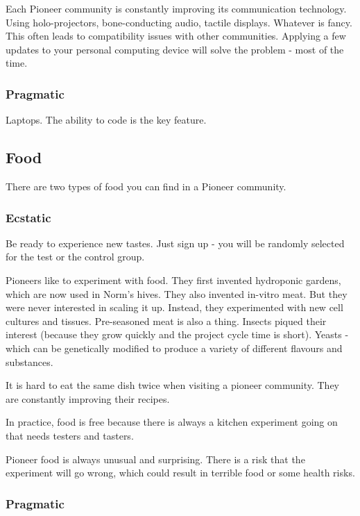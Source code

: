 Each Pioneer community is constantly improving its communication technology. Using holo-projectors, bone-conducting audio, tactile displays. Whatever is fancy.
This often leads to compatibility issues with other communities. Applying a few updates to your personal computing device will solve the problem - most of the time.

\subsubsection{Pragmatic}

Laptops. The ability to code is the key feature.

\subsection{Food}
\label{sec: pioneer food}

There are two types of food you can find in a Pioneer community.

\subsubsection{Ecstatic}

Be ready to experience new tastes. Just sign up - you will be randomly selected for the test or the control group.

Pioneers like to experiment with food. They first invented hydroponic gardens, which are now used in Norm's hives. They also invented in-vitro meat. But they were never interested in scaling it up. Instead, they experimented with new cell cultures and tissues. Pre-seasoned meat is also a thing.
Insects piqued their interest (because they grow quickly and the project cycle time is short). Yeasts - which can be genetically modified to produce a variety of different flavours and substances.

It is hard to eat the same dish twice when visiting a pioneer community. They are constantly improving their recipes.

In practice, food is free because there is always a kitchen experiment going on that needs testers and tasters.

Pioneer food is always unusual and surprising. There is a risk that the experiment will go wrong, which could result in terrible food or some health risks.

\subsubsection{Pragmatic}

